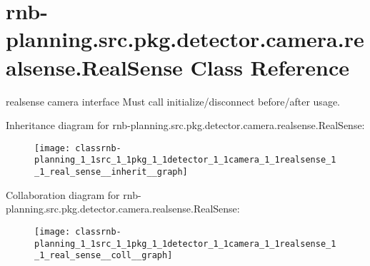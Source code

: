 \hypertarget{classrnb-planning_1_1src_1_1pkg_1_1detector_1_1camera_1_1realsense_1_1_real_sense}{}\section{rnb-\/planning.src.\+pkg.\+detector.\+camera.\+realsense.\+Real\+Sense Class Reference}
\label{classrnb-planning_1_1src_1_1pkg_1_1detector_1_1camera_1_1realsense_1_1_real_sense}


realsense camera interface Must call initialize/disconnect before/after usage.  




Inheritance diagram for rnb-\/planning.src.\+pkg.\+detector.\+camera.\+realsense.\+Real\+Sense\+:\nopagebreak
\begin{figure}[H]
\begin{center}
\leavevmode
\texttt{[image: classrnb-planning\_1\_1src\_1\_1pkg\_1\_1detector\_1\_1camera\_1\_1realsense\_1\_1\_real\_sense\_\_inherit\_\_graph]}
\end{center}
\end{figure}


Collaboration diagram for rnb-\/planning.src.\+pkg.\+detector.\+camera.\+realsense.\+Real\+Sense\+:\nopagebreak
\begin{figure}[H]
\begin{center}
\leavevmode
\texttt{[image: classrnb-planning\_1\_1src\_1\_1pkg\_1\_1detector\_1\_1camera\_1\_1realsense\_1\_1\_real\_sense\_\_coll\_\_graph]}
\end{center}
\end{figure}
